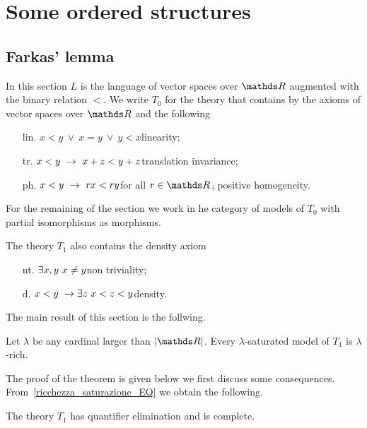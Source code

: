 \documentclass[creche.tex]{subfiles}
\begin{document}
\chapter{Some ordered structures}
\label{saturation}
 
\def\medrel#1{\parbox[t]{6ex}{$\displaystyle\hfil #1$}}
\def\ceq#1#2#3{\parbox{25ex}{$\displaystyle #1$}\medrel{#2}$\displaystyle  #3$}

\section{Farkas' lemma}
In this section $L$ is the language of vector spaces over $\RR$ augmented with the binary relation $<$. We write \emph{$T_0$\/} for the theory that contains by the axioms of vector spaces over $\RR$ and the following

\begin{itemize}
\item[lin.] $x<y\ \vee\ x=y\ \vee\  y<x$\hfill linearity;
\item[tr.] $x<y\ \rightarrow\ x+z < y+z$\hfill translation invariance;
\item[ph.] $x<y\ \rightarrow\ r x < r y$\quad for all $r\in\RR_+$\hfill positive homogeneity.
\end{itemize}
For the remaining of the section we work in he category of models of $T_0$ with partial isomorphisms as morphisms. 

The theory \emph{$T_1$\/} also contains the density axiom 

\begin{itemize}
\item[nt.] $\exists x,y\ x\neq y$\hfill non triviality;
\item[d.] $x<y\ \imp \E z\ x<z<y$\hfill density.
\end{itemize}

The main result of this section is the follwing.
\begin{theorem}
Let $\lambda$ be any cardinal larger than $|\RR|$. Every $\lambda$-saturated model of $T_1$ is $\lambda$-rich.
\end{theorem}

The proof of the theorem is given below we first discuss some consequences. From~\ref{ricchezza_saturazione_EQ} we obtain the following.

\begin{corollary}
The theory $T_1$ has quantifier elimination and is complete.
\end{corollary}
\end{document}
